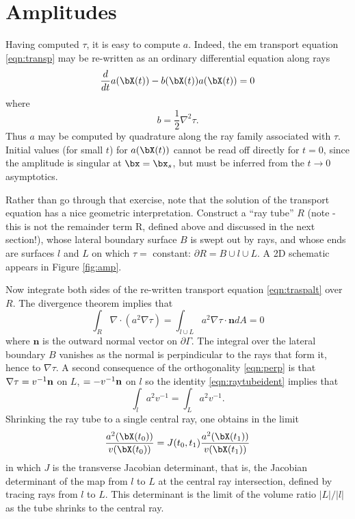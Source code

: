 \section{Amplitudes}
Having computed $\tau$, it is easy to compute $a$.  Indeed, the em
transport equation \ref{eqn:transp}
may be re-written as an ordinary differential equation along rays
\[
\frac{d}{dt} a (\bX(t)) - b(\bX(t))a(\bX(t)) = 0
\]
where
\[ 
b = \frac{1}{2} \nabla^2\tau.
\]
Thus $a$ may be computed by quadrature along the ray family associated with
$\tau$.  Initial values (for small $t$) for $a(\bX(t))$ cannot be read
off directly for $t=0$, since the amplitude is singular at
$\bx=\bx_s$, but must be inferred from the $t \rightarrow 0$ asymptotics. 

Rather than go through that exercise, note that the solution of the
transport equation has a nice geometric interpretation.
Construct a ``ray tube'' $R$ (note - this is not the remainder term R, defined above and discussed in the next section!), whose lateral boundary surface $B$ is swept out
by rays, and whose
ends are surfaces $l$ and $L$ on which $\tau =$ constant:
$\partial R
= B \cup l \cup L$. A 2D schematic appears in Figure \ref{fig:amp}. 


Now integrate both sides of the re-written transport equation
\ref{eqn:traspalt} over $R$. The divergence theorem implies that 
\begin{equation}
\label{eqn:raytubeident}
\int_{R} \nabla\cdot(a^2\nabla\tau)=\int_{l\cup L}a^2\nabla\tau\cdot \mathbf{n}dA =0
\end{equation}
where $\mathbf{n}$ is the outward normal vector on $\partial \Gamma$.
The integral over the lateral boundary $B$ vanishes as the normal is
perpindicular to the rays that form it, hence to $\nabla \tau$. A
second consequence of the orthogonality \ref{eqn:perp} is that 
$\nabla \tau = v^{-1}{\bf n}$ on $L$, $=-v^{-1}{\bf n} $ on $l$ so the identity
\ref{eqn:raytubeident} implies that
\begin{equation}
\label{eqn:transpsoln}
\int_{l} a^2 v^{-1} =\int_{L} a^2 v^{-1}. 
\end{equation}
Shrinking the ray tube to a single central ray, one obtains in the limit
\begin{equation}
\label{eqn:transpsolnpt}
\frac{a^2(\bX(t_0))}{v(\bX(t_0))} = J(t_0,t_1)
\frac{a^2(\bX(t_1))}{v(\bX(t_1))}
\end{equation}
in which $J$ is the transverse Jacobian determinant, that is, the Jacobian determinant of the
map from $l$ to $L$ at the central ray intersection, defined by
tracing rays from $l$ to $L$. This determinant is the limit of the
volume ratio $|L|/|l|$ as the tube shrinks to the central ray. 

